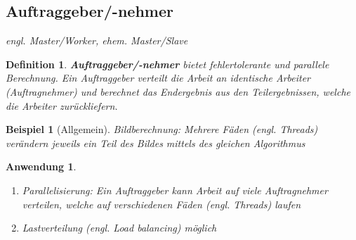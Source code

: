 \documentclass[a4paper]{article}
\theoremstyle{break}
\newtheorem{defi}{Definition}[section]
\newtheorem{ex}{Beispiel}[section]
\newtheorem{why}{Anwendung}[section]
\begin{document}
\subsection{Auftraggeber/-nehmer}
\textit{engl. Master/Worker, ehem. Master/Slave}
\begin{defi}
	\textbf{Auftraggeber/-nehmer} bietet fehlertolerante und parallele Berechnung. Ein Auftraggeber verteilt die Arbeit an identische Arbeiter (Auftragnehmer) und berechnet das Endergebnis aus den	Teilergebnissen, welche die Arbeiter zurückliefern.
\end{defi}
\begin{ex}[Allgemein]
	Bildberechnung: Mehrere Fäden (\textit{engl. Threads}) verändern jeweils ein Teil des Bildes mittels des gleichen Algorithmus
\end{ex}
\begin{why}
	\begin{enumerate}
		\item Parallelisierung: Ein Auftraggeber kann Arbeit auf viele Auftragnehmer verteilen, welche auf verschiedenen Fäden (\textit{engl. Threads}) laufen
		\item Lastverteilung (\textit{engl. Load balancing}) möglich
	\end{enumerate}
\end{why}
\end{document}

